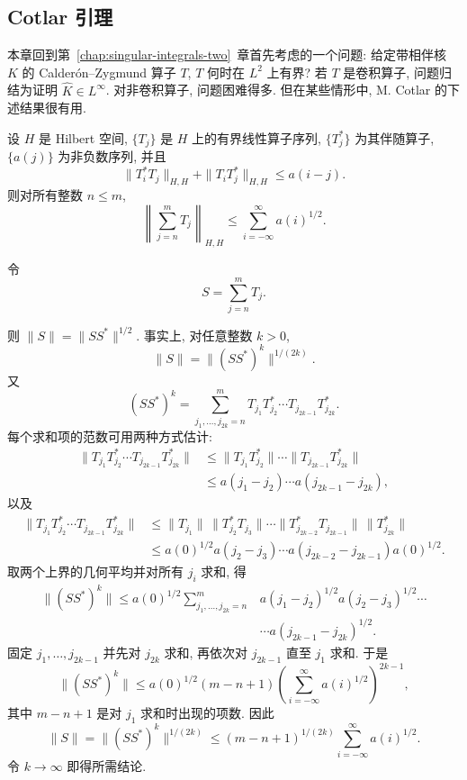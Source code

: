 \hypertarget{chapter-09-page-207}{}
\subsection{Cotlar 引理}
\label{sec:ch9-cotlar-lemma}

本章回到第~\ref{chap:singular-integrals-two}~章首先考虑的一个问题: 给定带相伴核 $K$ 的 Calderón--Zygmund 算子 $T$, $T$ 何时在 $L^2$ 上有界? 若 $T$ 是卷积算子, 问题归结为证明 $\widehat K\in L^\infty$. 对非卷积算子, 问题困难得多. 但在某些情形中, M. Cotlar 的下述结果很有用.

\begin{Lemma}
\label{lem:ch9-cotlar}
设 $H$ 是 Hilbert 空间, $\{T_j\}$ 是 $H$ 上的有界线性算子序列, $\{T_j^*\}$ 为其伴随算子, $\{a(j)\}$ 为非负数序列, 并且
\[
 \|T_i^*T_j\|_{H,H}+\|T_iT_j^*\|_{H,H}\le a(i-j).
\]
则对所有整数 $n\le m$,
\[
 \left\|\sum_{j=n}^mT_j\right\|_{H,H}
 \le\sum_{i=-\infty}^{\infty}a(i)^{1/2}.
\]
\end{Lemma}

\begin{Proof}
令
\[
 S=\sum_{j=n}^mT_j.
\]

\hypertarget{chapter-09-page-208}{}
则 $\|S\|=\|SS^*\|^{1/2}$. 事实上, 对任意整数 $k>0$,
\[
 \|S\|=\|(SS^*)^k\|^{1/(2k)}.
\]
又
\[
 (SS^*)^k=
 \sum_{j_1,\ldots,j_{2k}=n}^m
 T_{j_1}T_{j_2}^*\cdots T_{j_{2k-1}}T_{j_{2k}}^*.
\]
每个求和项的范数可用两种方式估计:
\[
 \begin{aligned}
 \|T_{j_1}T_{j_2}^*\cdots T_{j_{2k-1}}T_{j_{2k}}^*\|
 &\le\|T_{j_1}T_{j_2}^*\|\cdots
 \|T_{j_{2k-1}}T_{j_{2k}}^*\|\\
 &\le a(j_1-j_2)\cdots a(j_{2k-1}-j_{2k}),
 \end{aligned}
\]
以及
\[
 \begin{aligned}
 \|T_{j_1}T_{j_2}^*\cdots T_{j_{2k-1}}T_{j_{2k}}^*\|
 &\le\|T_{j_1}\|\,\|T_{j_2}^*T_{j_3}\|\cdots
 \|T_{j_{2k-2}}^*T_{j_{2k-1}}\|\,\|T_{j_{2k}}^*\|\\
 &\le a(0)^{1/2}a(j_2-j_3)\cdots
 a(j_{2k-2}-j_{2k-1})a(0)^{1/2}.
 \end{aligned}
\]
取两个上界的几何平均并对所有 $j_i$ 求和, 得
\[
 \begin{aligned}
 \|(SS^*)^k\|
 \le a(0)^{1/2}\sum_{j_1,\ldots,j_{2k}=n}^m
 &a(j_1-j_2)^{1/2}a(j_2-j_3)^{1/2}\cdots\\
 &\cdots a(j_{2k-1}-j_{2k})^{1/2}.
 \end{aligned}
\]
固定 $j_1,\ldots,j_{2k-1}$ 并先对 $j_{2k}$ 求和, 再依次对 $j_{2k-1}$ 直至 $j_1$ 求和. 于是
\[
 \|(SS^*)^k\|
 \le a(0)^{1/2}(m-n+1)
 \left(\sum_{i=-\infty}^{\infty}a(i)^{1/2}\right)^{2k-1},
\]
其中 $m-n+1$ 是对 $j_1$ 求和时出现的项数. 因此
\[
 \|S\|=\|(SS^*)^k\|^{1/(2k)}
 \le(m-n+1)^{1/(2k)}
 \sum_{i=-\infty}^{\infty}a(i)^{1/2}.
\]
令 $k\to\infty$ 即得所需结论.
\end{Proof}

